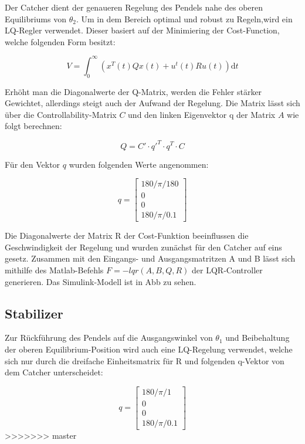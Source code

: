 Der Catcher dient der genaueren Regelung des Pendels nahe des oberen Equilibriums von $ \theta_2 $. Um in dem Bereich optimal und robust zu Regeln,wird ein LQ-Regler verwendet. Dieser basiert auf der Minimiering der Cost-Function, welche folgenden Form besitzt:

\begin{equation}
 V = \int_0^\infty \! (x^T(t) Qx(t) + u^t(t) R u(t))  \mathrm{d}t
\end{equation}

Erhöht man die Diagonalwerte der Q-Matrix, werden die Fehler stärker Gewichtet, allerdings steigt auch der Aufwand der Regelung. Die Matrix lässt sich über die Controllability-Matrix $C$ und den linken Eigenvektor q der Matrix $A$
wie folgt berechnen:

\begin{equation}
 Q = C' \cdot q'^T \cdot q^T \cdot C
\end{equation}

Für den Vektor $q$ wurden folgenden Werte angenommen:

\begin{equation}
q =\begin{bmatrix}
         180/\pi/180 \\
         0\\
         0\\
         180/\pi/0.1
        \end{bmatrix}
\end{equation}
 
Die Diagonalwerte der Matrix R der Cost-Funktion beeinflussen die Geschwindigkeit der Regelung und wurden zunächst für den Catcher auf eins gesetz.
Zusammen mit den Eingangs- und Ausgangsmatritzen A und B lässt sich mithilfe des Matlab-Befehls $F = -lqr(A,B,Q,R)$ der LQR-Controller generieren.
Das Simulink-Modell ist in Abb zu sehen.


\subsection{Stabilizer}
\label{stabilizer} 

Zur Rückführung des Pendels auf die Ausgangswinkel von $\theta_1$ und Beibehaltung der oberen Equilibrium-Position wird auch eine LQ-Regelung verwendet, welche sich nur durch die dreifache Einheitsmatrix für R und folgenden q-Vektor von dem Catcher unterscheidet:

\begin{equation}
q =\begin{bmatrix}
         180/\pi/1 \\
         0\\
         0\\
         180/\pi/0.1
        \end{bmatrix}
\end{equation}
>>>>>>> master

